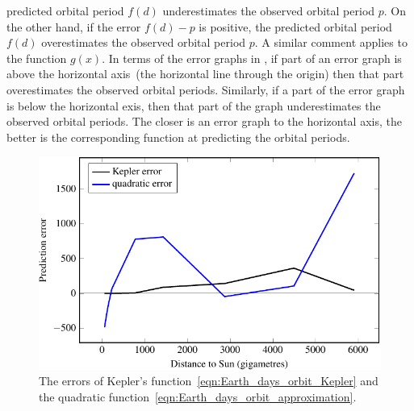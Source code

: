 \documentclass[a4paper,oneside,12pt]{article}
\begin{document}
\begin{problem}
{\begin{solution}
predicted orbital period $f(d)$ underestimates the observed orbital
period $p$.  On the other hand, if the error $f(d) - p$ is positive,
the predicted orbital period $f(d)$ overestimates the observed orbital
period $p$.  A similar comment applies to the function $g(x)$.  In
terms of the error graphs in
, if part of an error graph
is above the horizontal axis~(the horizontal line through the origin)
then that part overestimates the observed orbital periods.  Similarly,
if a part of the error graph is below the horizontal exis, then that
part of the graph underestimates the observed orbital periods.  The
closer is an error graph to the horizontal axis, the better is the
corresponding function at predicting the orbital periods.

\begin{table}[!htbp]
\centering

\caption{%
  The orbital period of a planet as a function of its distance~(in
  gigametres) to the Sun.  This is the same as
  , but missing entries have been
  filled in.  All numbers in the fourth and fifth columns have been
  rounded to one decimal place.  The sixth and seventh columns list,
  respectively, the errors of Kepler's
   and the quadratic
  .  Numbers in these
  columns have been rounded to two decimal places.  Note that most
  numbers in the table have been rounded in order to fit the table.
  However, you should not round these intermediate results when you
  use them to calculate the root mean square errors.
}
\label{tab:planet_orbital_periods_errors}
\end{table}

\begin{figure}[!htbp]
\centering
\includegraphics[scale=1.1]{image/09/period-error.pdf}
\caption{%
  The errors of Kepler's function~\eqref{eqn:Earth_days_orbit_Kepler}
  and the quadratic
  function~\eqref{eqn:Earth_days_orbit_approximation}.
}
\label{fig:orbital_periods_error_analysis}
\end{figure}


\end{solution}}
\end{problem}
\end{document}
